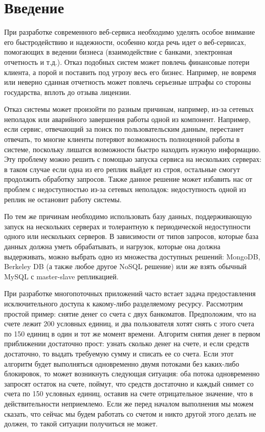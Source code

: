 \section{Введение}

При разработке современного веб-сервиса необходимо уделять особое внимание его быстродействию и надежности, особенно когда речь идет о веб-сервисах, помогающих в ведении бизнеса (взаимодействие с банками, электронная отчетность и т.д.). Отказ подобных систем может повлечь финансовые потери клиента, а порой и поставить под угрозу весь его бизнес. Например, не вовремя или неверно сданная отчетность может повлечь серьезные штрафы со стороны государства, вплоть до отзыва лицензии.

Отказ системы может произойти по разным причинам, например, из-за сетевых неполадок или аварийного завершения работы одной из компонент. Например, если сервис, отвечающий за поиск по пользовательским данным, перестанет отвечать, то многие клиенты потеряют возможность полноценной работы в системе, поскольку лишатся возможности быстро находить нужную информацию. Эту проблему можно решить с помощью запуска сервиса на нескольких серверах: в таком случае если одна из его реплик выйдет из строя, остальные смогут продолжить обработку запросов. Также данное решение может избавить нас от проблем с недоступностью из-за сетевых неполадок: недоступность одной из реплик не остановит работу системы.

По тем же причинам необходимо использовать базу данных, поддерживающую запуск на нескольких серверах и толерантную к периодической недоступности одного или нескольких серверов. В зависимости от типов запросов, которые база данных должна уметь обрабатывать, и нагрузок, которые она должна выдерживать, можно выбрать одно из множества доступных решений: MongoDB, Berkeley DB (а также любое другое NoSQL решение) или же взять обычный MySQL с master-slave репликацией.

При разработке многопоточных приложений часто встает задача предоставления исключительного доступа к какому-либо разделяемому ресурсу. Рассмотрим простой пример: снятие денег со счета с двух банкоматов. Предположим, что на счете лежит 200 условных единиц, и два пользователя хотят снять с этого счета по 150 единиц в один и тот же момент времени. Алгоритм снятия денег в первом приближении достаточно прост: узнать сколько денег на счете, и если средств достаточно, то выдать требуемую сумму и списать ее со счета. Если этот алгоритм будет выполняться одновременно двумя потоками без каких-либо блокировок, то может возникнуть следующая ситуация: оба потока одновременно запросят остаток на счете, поймут, что средств достаточно и каждый снимет со счета по 150 условных единиц, оставив на счете отрицательное значение, что в действительности неприемлемо. Если же перед началом выполнения мы можем сказать, что сейчас мы будем работать со счетом и никто другой этого делать не должен, то такой ситуации получиться не может.

